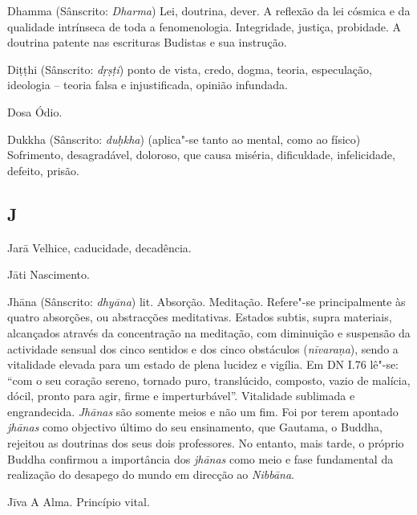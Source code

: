 \begin{glossarydescription}

\item[Dhamma] (Sânscrito: \emph{Dharma}) Lei, doutrina, dever. A reflexão da
lei cósmica e da qualidade intrínseca de toda a fenomenologia. Integridade,
justiça, probidade. A doutrina patente nas escrituras Budistas e sua
instrução.

\item[Diṭṭhi] (Sânscrito: \emph{dṛṣṭi}) ponto de vista, credo, dogma, teoria,
especulação, ideologia -- teoria falsa e injustificada, opinião infundada.

\item[Dosa] Ódio.

\item[Dukkha] (Sânscrito: \emph{duḥkha}) (aplica"-se tanto ao mental, como ao
físico) Sofrimento, desagradável, doloroso, que causa miséria, dificuldade,
infelicidade, defeito, prisão.

\end{glossarydescription}

\subsection{J}

\begin{glossarydescription}

\item[Jarā] Velhice, caducidade, decadência.

\item[Jāti] Nascimento.

\item[Jhāna] (Sânscrito: \emph{dhyāna}) lit. Absorção. Meditação. Refere"-se
principalmente às quatro absorções, ou abstracções meditativas. Estados subtis,
supra materiais, alcançados através da concentração na meditação, com diminuição
e suspensão da actividade sensual dos cinco sentidos e dos cinco obstáculos
(\emph{nīvaraṇa}), sendo a vitalidade elevada para um estado de plena lucidez e
vigília. Em DN I.76 lê"-se: “com o seu coração sereno, tornado puro, translúcido,
composto, vazio de malícia, dócil, pronto para agir, firme e imperturbável”.
Vitalidade sublimada e engrandecida. \emph{Jhānas} são somente meios e não um
fim. Foi por terem apontado \emph{jhānas} como objectivo último do seu
ensinamento, que Gautama, o Buddha, rejeitou as doutrinas dos seus dois
professores. No entanto, mais tarde, o próprio Buddha confirmou a importância
dos \emph{jhānas} como meio e fase fundamental da realização do desapego do
mundo em direcção ao \emph{Nibbāna}.

\item[Jīva] A Alma. Princípio vital.

\end{glossarydescription}

